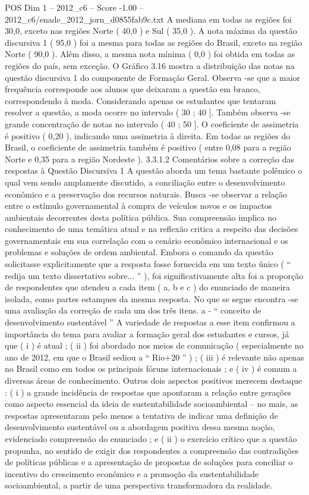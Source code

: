 \begin{textsample}{POS Dim 1 – 2012\_c6 – Score -1.00 – 2012\_c6/enade\_2012\_jorn\_d0855fab9c.txt}
A mediana em todas as regiões foi 30,0, exceto nas regiões Norte ( 40,0 ) e Sul ( 35,0 ).
A nota máxima da questão discursiva 1 ( 95,0 ) foi a mesma para todas as regiões do Brasil, exceto na região Norte ( 90,0 ).
Além disso, a mesma nota mínima ( 0,0 ) foi obtida em todas as regiões do país, sem exceção.
O Gráfico 3.16 mostra a distribuição das notas na questão discursiva 1 do componente de Formação Geral.
Observa -se que a maior frequência corresponde aos alunos que deixaram a questão em branco, correspondendo à moda.
Considerando apenas os estudantes que tentaram resolver a questão, a moda ocorre no intervalo ( 30 ; 40 ].
Também observa -se grande concentração de notas no intervalo ( 40 ; 50 ].
O coeficiente de assimetria é positivo ( 0,20 ), indicando uma assimetria à direita.
Em todas as regiões do Brasil, o coeficiente de assimetria também é positivo ( entre 0,08 para a região Norte e 0,35 para a região Nordeste ). 3.3.1.2 Comentários sobre a correção das respostas à Questão Discursiva 1 A questão aborda um tema bastante polêmico o qual vem sendo amplamente discutido, a conciliação entre o desenvolvimento econômico e a preservação dos recursos naturais.
Busca -se observar a relação entre o estímulo governamental à compra de veículos novos e os impactos ambientais decorrentes desta política pública.
Sua compreensão implica no conhecimento de uma temática atual e na reflexão critica a respeito das decisões governamentais em sua correlação com o cenário econômico internacional e os problemas e soluções de ordem ambiental.
Embora o comando da questão solicitasse explicitamente que a resposta fosse fornecida em um texto único ( “ redija um texto dissertativo sobre... ” ), foi significativamente alta foi a proporção de respondentes que atendeu a cada item ( a, b e c ) do enunciado de maneira isolada, como partes estanques da mesma resposta.
No que se segue encontra -se uma avaliação da correção de cada um dos três itens. a - “ conceito de desenvolvimento sustentável ” A variedade de respostas a esse item confirmou a importância do tema para avaliar a formação geral dos estudantes e cursos, já que ( i ) é atual ; ( ii ) foi abordado nos meios de comunicação ( especialmente no ano de 2012, em que o Brasil sediou a “ Rio+20 ” ) ; ( iii ) é relevante não apenas no Brasil como em todos os principais fóruns internacionais ; e ( iv ) é comum a diversas áreas de conhecimento.
Outros dois aspectos positivos merecem destaque : ( i ) a grande incidência de respostas que apontaram a relação entre gerações como aspecto essencial da ideia de sustentabilidade socioambiental – no mais, as respostas apresentaram pelo menos a tentativa de indicar uma definição de desenvolvimento sustentável ou a abordagem positiva dessa mesma noção, evidenciado compreensão do enunciado ; e ( ii ) o exercício crítico que a questão propunha, no sentido de exigir dos respondentes a compreensão das contradições de políticas públicas e a apresentação de propostas de soluções para conciliar o incentivo do crescimento econômico e a promoção da sustentabilidade socioambiental, a partir de uma perspectiva transformadora da realidade.

\end{textsample}

